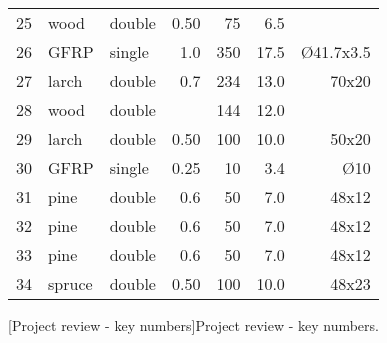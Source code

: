 \begin{table}[p]
\begin{fullpage}
\begin{tabularx}{\textwidth}{@{}lXl rrrr@{}}
25 & wood & double & 0.50 & 75 & 6.5 & \\
26 & GFRP & single & 1.0 & 350 & 17.5 & \O 41.7x3.5\\
27 & larch & double & 0.7 & 234 & 13.0 & 70x20\\
28 & wood & double &  & 144 & 12.0 & \\
29 & larch & double & 0.50 & 100 & 10.0 & 50x20\\
30 & GFRP & single & 0.25 & 10 & 3.4 & \O 10\\
31 & pine & double & 0.6 & 50 & 7.0 & 48x12\\
32 & pine & double & 0.6 & 50 & 7.0 & 48x12\\
33 & pine & double & 0.6 & 50 & 7.0 & 48x12\\
34 & spruce & double & 0.50 & 100 & 10.0 & 48x23\\
\bottomrule
 	\end{tabularx}
[Project review - key numbers]{Project review - key numbers.}
\end{fullpage}
\end{table}



